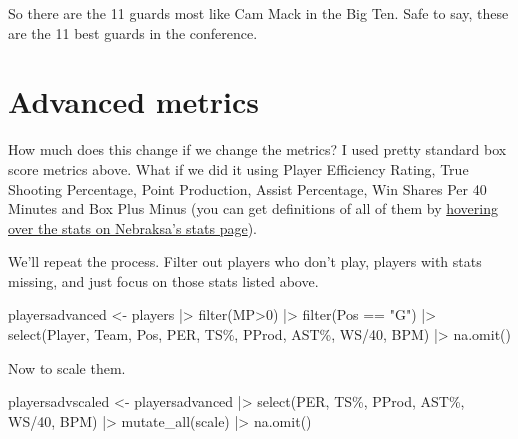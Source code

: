 \documentclass[
  letterpaper,
  DIV=11,
  numbers=noendperiod]{scrreprt}
\newenvironment{Shaded}{\begin{snugshade}}{\end{snugshade}}
\newcommand{\AttributeTok}[1]{\textcolor[rgb]{0.40,0.45,0.13}{#1}}
\newcommand{\DecValTok}[1]{\textcolor[rgb]{0.68,0.00,0.00}{#1}}
\newcommand{\FunctionTok}[1]{\textcolor[rgb]{0.28,0.35,0.67}{#1}}
\newcommand{\NormalTok}[1]{\textcolor[rgb]{0.00,0.23,0.31}{#1}}
\newcommand{\OtherTok}[1]{\textcolor[rgb]{0.00,0.23,0.31}{#1}}
\newcommand{\SpecialCharTok}[1]{\textcolor[rgb]{0.37,0.37,0.37}{#1}}
\newcommand{\StringTok}[1]{\textcolor[rgb]{0.13,0.47,0.30}{#1}}
\begin{document}
So there are the 11 guards most like Cam Mack in the Big Ten. Safe to
say, these are the 11 best guards in the conference.

\hypertarget{advanced-metrics}{%
\section{Advanced metrics}\label{advanced-metrics}}

How much does this change if we change the metrics? I used pretty
standard box score metrics above. What if we did it using Player
Efficiency Rating, True Shooting Percentage, Point Production, Assist
Percentage, Win Shares Per 40 Minutes and Box Plus Minus (you can get
definitions of all of them by
\href{https://www.sports-reference.com/cbb/schools/nebraska/2020.html}{hovering
over the stats on Nebraksa's stats page}).

We'll repeat the process. Filter out players who don't play, players
with stats missing, and just focus on those stats listed above.

\begin{Shaded}
\begin{Highlighting}[]
\NormalTok{playersadvanced }\OtherTok{\textless{}{-}}\NormalTok{ players }\SpecialCharTok{|\textgreater{}} 
  \FunctionTok{filter}\NormalTok{(MP}\SpecialCharTok{\textgreater{}}\DecValTok{0}\NormalTok{) }\SpecialCharTok{|\textgreater{}} 
  \FunctionTok{filter}\NormalTok{(Pos }\SpecialCharTok{==} \StringTok{"G"}\NormalTok{) }\SpecialCharTok{|\textgreater{}} 
  \FunctionTok{select}\NormalTok{(Player, Team, Pos, PER, }\StringTok{\textasciigrave{}}\AttributeTok{TS\%}\StringTok{\textasciigrave{}}\NormalTok{, PProd, }\StringTok{\textasciigrave{}}\AttributeTok{AST\%}\StringTok{\textasciigrave{}}\NormalTok{, }\StringTok{\textasciigrave{}}\AttributeTok{WS/40}\StringTok{\textasciigrave{}}\NormalTok{, BPM) }\SpecialCharTok{|\textgreater{}} 
  \FunctionTok{na.omit}\NormalTok{() }
\end{Highlighting}
\end{Shaded}

Now to scale them.

\begin{Shaded}
\begin{Highlighting}[]
\NormalTok{playersadvscaled }\OtherTok{\textless{}{-}}\NormalTok{ playersadvanced }\SpecialCharTok{|\textgreater{}} 
  \FunctionTok{select}\NormalTok{(PER, }\StringTok{\textasciigrave{}}\AttributeTok{TS\%}\StringTok{\textasciigrave{}}\NormalTok{, PProd, }\StringTok{\textasciigrave{}}\AttributeTok{AST\%}\StringTok{\textasciigrave{}}\NormalTok{, }\StringTok{\textasciigrave{}}\AttributeTok{WS/40}\StringTok{\textasciigrave{}}\NormalTok{, BPM) }\SpecialCharTok{|\textgreater{}} 
  \FunctionTok{mutate\_all}\NormalTok{(scale) }\SpecialCharTok{|\textgreater{}} 
  \FunctionTok{na.omit}\NormalTok{()}
\end{Highlighting}
\end{Shaded}
\end{document}
